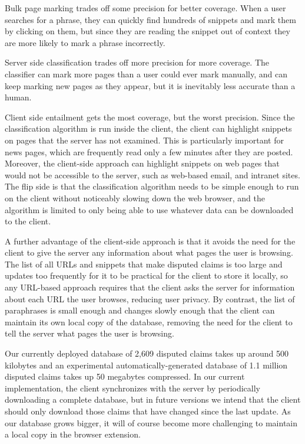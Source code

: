 \documentclass{www2010-accepted}
\begin{document}
Bulk page marking trades off some precision for better coverage. When a user searches for a phrase, they can quickly find hundreds of snippets and mark them by clicking on them, but since they are reading the snippet out of context they are more likely to mark a phrase incorrectly. 

Server side classification trades off more precision for more coverage. The classifier can mark more pages than a user could ever mark manually, and can keep marking new pages as they appear, but it is inevitably less accurate than a human.

Client side entailment gets the most coverage, but the worst precision. Since the classification algorithm is run inside the client, the client can highlight snippets on pages that the server has not examined. This is particularly important for news pages, which are frequently read only a few minutes after they are posted. Moreover, the client-side approach can highlight snippets on web pages that would not be accessible to the server, such as web-based email, and intranet sites. The flip side is that the classification algorithm needs to be simple enough to run on the client without noticeably slowing down the web browser, and the algorithm is limited to only being able to use whatever data can be downloaded to the client.

A further advantage of the client-side approach is that it avoids the need for the client to give the server any information about what pages the user is browsing. The list of all URLs and snippets that make disputed claims is too large and updates too frequently for it to be practical for the client to store it locally, so any URL-based approach requires that the client asks the server for information about each URL the user browses, reducing user privacy. By contrast, the list of paraphrases is small enough and changes slowly enough that the client can maintain its own local copy of the database, removing the need for the client to tell the server what pages the user is browsing. 

Our currently deployed database of 2,609 disputed claims takes up around 500 kilobytes and an experimental automatically-generated database of 1.1 million disputed claims takes up 50 megabytes compressed. In our current implementation, the client synchronizes with the server by periodically downloading a complete database, but in future versions we intend that the client should only download those claims that have changed since the last update. As our database grows bigger, it will of course become more challenging to maintain a local copy in the browser extension.
\end{document}
